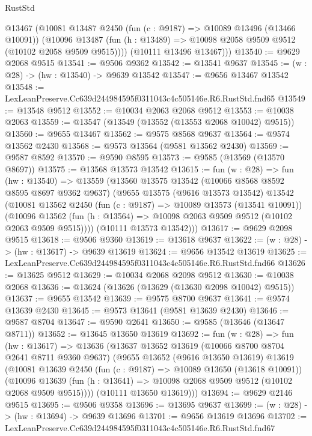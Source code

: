 \begin{lexlean}{RustStd}
\begin{coremodule}
        @13467
        (@10081
          @13487
          @2450
          (fun (c : @9187) => @10089 @13496 (@13466 @10091))
          (@10096 @13487 (fun (h : @13489) => @10098 @2058 @9509 @9512 (@10102 @2058 @9509 @9515))))
        (@10111 @13496 @13467)))
@13540 := @9629 @2068 @9515
@13541 := @9506 @9362
@13542 := @13541 @9637
@13545 := (w : @28) -> (hw : @13540) -> @9639 @13542
@13547 := @9656 @13467 @13542
@13548 := LexLeanPreserve.Cc639d244984595f0311043c4c505146e.R6.RustStd.fnd65
@13549 := @13548 @9512
@13552 := @10034 @2063 @2068 @9512
@13553 := @10038 @2063
@13559 := @13547 (@13549 (@13552 (@13553 @2068 @10042) @9515))
@13560 := @9655 @13467
@13562 := @9575 @8568 @9637
@13564 := @9574 @13562 @2430
@13568 := @9573 @13564 (@9581 @13562 @2430)
@13569 := @9587 @8592
@13570 := @9590 @8595
@13573 := @9585 (@13569 (@13570 @8697))
@13575 := @13568 @13573 @13542
@13615 := fun (w : @28) =>
  fun (hw : @13540) =>
  @13559
    (@13560
      @13575
      @13542
      (@10066 @8568 @8592 @8595 @8697 @9362 @9637)
      (@9655
        @13575
        (@9616 @13573 @13542)
        @13542
        (@10081
          @13562
          @2450
          (fun (c : @9187) => @10089 @13573 (@13541 @10091))
          (@10096 @13562 (fun (h : @13564) => @10098 @2063 @9509 @9512 (@10102 @2063 @9509 @9515))))
        (@10111 @13573 @13542)))
@13617 := @9629 @2098 @9515
@13618 := @9506 @9360
@13619 := @13618 @9637
@13622 := (w : @28) -> (hw : @13617) -> @9639 @13619
@13624 := @9656 @13542 @13619
@13625 := LexLeanPreserve.Cc639d244984595f0311043c4c505146e.R6.RustStd.fnd66
@13626 := @13625 @9512
@13629 := @10034 @2068 @2098 @9512
@13630 := @10038 @2068
@13636 := @13624 (@13626 (@13629 (@13630 @2098 @10042) @9515))
@13637 := @9655 @13542
@13639 := @9575 @8700 @9637
@13641 := @9574 @13639 @2430
@13645 := @9573 @13641 (@9581 @13639 @2430)
@13646 := @9587 @8704
@13647 := @9590 @2641
@13650 := @9585 (@13646 (@13647 @8711))
@13652 := @13645 @13650 @13619
@13692 := fun (w : @28) =>
  fun (hw : @13617) =>
  @13636
    (@13637
      @13652
      @13619
      (@10066 @8700 @8704 @2641 @8711 @9360 @9637)
      (@9655
        @13652
        (@9616 @13650 @13619)
        @13619
        (@10081
          @13639
          @2450
          (fun (c : @9187) => @10089 @13650 (@13618 @10091))
          (@10096 @13639 (fun (h : @13641) => @10098 @2068 @9509 @9512 (@10102 @2068 @9509 @9515))))
        (@10111 @13650 @13619)))
@13694 := @9629 @2146 @9515
@13695 := @9506 @9358
@13696 := @13695 @9637
@13699 := (w : @28) -> (hw : @13694) -> @9639 @13696
@13701 := @9656 @13619 @13696
@13702 := LexLeanPreserve.Cc639d244984595f0311043c4c505146e.R6.RustStd.fnd67

\end{coremodule}
\end{lexlean}
